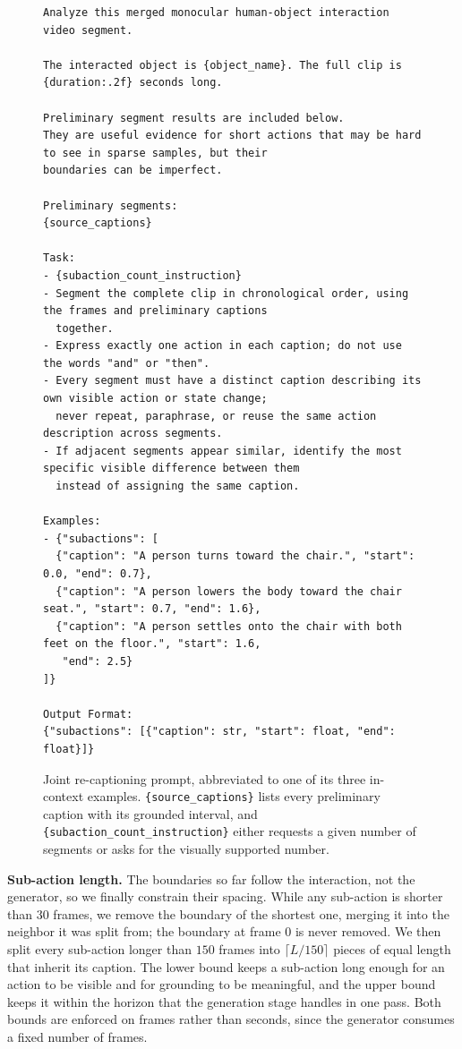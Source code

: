 \begin{figure}[t]
\centering
\small
\begin{verbatim}
Analyze this merged monocular human-object interaction video segment.

The interacted object is {object_name}. The full clip is {duration:.2f} seconds long.

Preliminary segment results are included below.
They are useful evidence for short actions that may be hard to see in sparse samples, but their
boundaries can be imperfect.

Preliminary segments:
{source_captions}

Task:
- {subaction_count_instruction}
- Segment the complete clip in chronological order, using the frames and preliminary captions
  together.
- Express exactly one action in each caption; do not use the words "and" or "then".
- Every segment must have a distinct caption describing its own visible action or state change;
  never repeat, paraphrase, or reuse the same action description across segments.
- If adjacent segments appear similar, identify the most specific visible difference between them
  instead of assigning the same caption.

Examples:
- {"subactions": [
  {"caption": "A person turns toward the chair.", "start": 0.0, "end": 0.7},
  {"caption": "A person lowers the body toward the chair seat.", "start": 0.7, "end": 1.6},
  {"caption": "A person settles onto the chair with both feet on the floor.", "start": 1.6,
   "end": 2.5}
]}

Output Format:
{"subactions": [{"caption": str, "start": float, "end": float}]}
\end{verbatim}
\caption{Joint re-captioning prompt, abbreviated to one of its three
in-context examples.  \texttt{\{source\_captions\}} lists every preliminary
caption with its grounded interval, and
\texttt{\{subaction\_count\_instruction\}} either requests a given number of
segments or asks for the visually supported number.}
\label{fig:supp_prompt_merge}
\end{figure}

\noindent\textbf{Sub-action length.}
The boundaries so far follow the interaction, not the generator, so we finally
constrain their spacing.  While any sub-action is shorter than $30$ frames, we
remove the boundary of the shortest one, merging it into the neighbor it was
split from; the boundary at frame $0$ is never removed.  We then split every
sub-action longer than $150$ frames into $\lceil L/150 \rceil$ pieces of equal
length that inherit its caption.  The lower bound keeps a sub-action long enough
for an action to be visible and for grounding to be meaningful, and the upper
bound keeps it within the horizon that the generation stage handles in one pass.
Both bounds are enforced on frames rather than seconds, since the generator
consumes a fixed number of frames.

